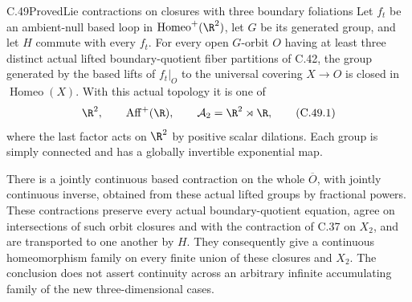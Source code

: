\begin{claim}{C.49}{Proved}{Lie contractions on closures with three boundary foliations}
Let $f_t$ be an ambient-null based loop in
$\operatorname{Homeo}^+(\R^2)$, let $G$ be its generated group,
and let $H$ commute with every $f_t$.
For every open $G$-orbit $O$ having at least three distinct actual
lifted boundary-quotient fiber partitions of C.42, the group
generated by the based lifts of $f_t|_O$ to the universal covering
$X\to O$ is closed in $\operatorname{Homeo}(X)$. With this actual
topology it is one of
\[
 \R^2,\qquad \operatorname{Aff}^+(\R),\qquad
 \mathcal A_2=\R^2\rtimes\R ,
                                                        \tag{C.49.1}
\]
where the last factor acts on $\R^2$ by positive scalar
dilations. Each group is simply connected and has a globally
invertible exponential map.

There is a jointly continuous based contraction on the whole
$\overline O$, with jointly continuous inverse, obtained from
these actual lifted groups by fractional powers.
These contractions preserve every actual boundary-quotient
equation, agree on intersections of such orbit closures and
with the contraction of C.37 on $X_2$, and are transported to
one another by $H$.
They consequently give a continuous homeomorphism family on
every finite union of these closures and $X_2$.
The conclusion does not assert continuity across an arbitrary
infinite accumulating family of the new three-dimensional
cases.
\end{claim}

